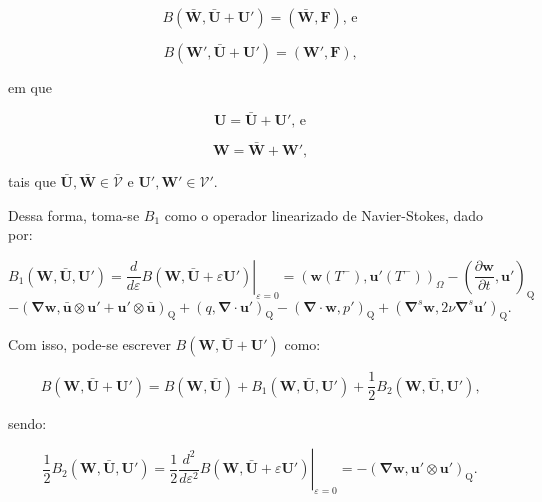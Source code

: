 \documentclass[_ArquivoPrincipal.tex]{subfiles}
\begin{document}
\begin{equation}
    B(\bar{\mathbf{W}},\bar{\mathbf{U}}+\mathbf{U}')=(\bar{\mathbf{W}},\mathbf{F})\text{, e}
    \label{B-3}
\end{equation}

\begin{equation}
    B(\mathbf{W}',\bar{\mathbf{U}}+\mathbf{U}')=(\mathbf{W}',\mathbf{F})\text{,}
    \label{B-4}
\end{equation}

\noindent em que

\begin{equation}
    \mathbf{U}=\bar{\mathbf{U}}+\mathbf{U}'\text{, e}
    \label{U}
\end{equation}

\begin{equation}
    \mathbf{W}=\bar{\mathbf{W}}+\mathbf{W}'\text{,}
    \label{W}
\end{equation}

\noindent tais que $\bar{\mathbf{U}},\bar{\mathbf{W}}\in\bar{\mathcal{V}}$ e $\mathbf{U}',\mathbf{W}'\in\mathcal{V}'$.

Dessa forma, toma-se $B_1$ como o operador linearizado de Navier-Stokes, dado por:

\[B_1(\mathbf{W},\bar{\mathbf{U}},\mathbf{U}')=\left.\frac{d}{d\varepsilon}B(\mathbf{W},\bar{\mathbf{U}}+\varepsilon\mathbf{U}')\right|_{\varepsilon=0}
=(\mathbf{w}(T^-),\mathbf{u}'(T^-))_\Omega
-\left(\frac{\partial\mathbf{w}}{\partial t},\mathbf{u}'\right)_\mathrm{Q}\]
\begin{equation}
    -(\mathbf{\nabla}\mathbf{w},\bar{\mathbf{u}}\otimes\mathbf{u}'+\mathbf{u}'\otimes\bar{\mathbf{u}})_\mathrm{Q}
    +(q,\mathbf{\nabla}\cdot\mathbf{u}')_\mathrm{Q}
    -(\mathbf{\nabla}\cdot\mathbf{w},p')_\mathrm{Q}
    +(\mathbf{\nabla}^s\mathbf{w},2\nu\mathbf{\nabla}^s\mathbf{u}')_\mathrm{Q}
    \text{.}
    \label{B_1}
\end{equation}

Com isso, pode-se escrever $B(\mathbf{W},\bar{\mathbf{U}}+\mathbf{U}')$ como:

\begin{equation}
    B(\mathbf{W},\bar{\mathbf{U}}+\mathbf{U}')=B(\mathbf{W},\bar{\mathbf{U}})+B_1(\mathbf{W},\bar{\mathbf{U}},\mathbf{U}')+\frac{1}{2}B_2(\mathbf{W},\bar{\mathbf{U}},\mathbf{U}')\text{,}
    \label{B-5}
\end{equation}

\noindent sendo:

\begin{equation}
    \frac{1}{2}B_2(\mathbf{W},\bar{\mathbf{U}},\mathbf{U}')=\frac{1}{2}\left.\frac{d^2}{d\varepsilon^2}B(\mathbf{W},\bar{\mathbf{U}}+\varepsilon\mathbf{U}')\right|_{\varepsilon=0}=-(\mathbf{\nabla}\mathbf{w},\mathbf{u}'\otimes\mathbf{u}')_\mathrm{Q}\text{.}
    \label{B_2}
\end{equation}
\end{document}
